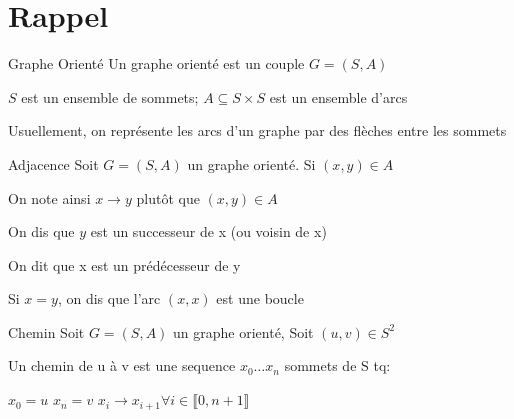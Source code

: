 \documentclass[a4paper,french,bookmarks]{article}
\begin{document}
    \renewcommand{\thesection}{\Roman{section}} 
    \renewcommand{\thesubsection}{\thesection.\Alph{subsection}}
    \renewcommand{\labelenumi}{\thesection.\arabic{enumi}.}
    \renewcommand*{\labelenumii}{\alph{enumii}.}
    \renewcommand*{\labelenumiii}{\alph{enumiii}.}
    
    \def\authorvar{DRISSI Rayan}

    \section{Rappel}


    \begin{definition}{Graphe Orienté}{}
        Un graphe orienté est un couple $G = (S, A)$
        
        \begin{enumerate}
            \itt $S$ est un ensemble de sommets;
            \itt $A \subseteq S \times S$ est un ensemble d'arcs 
        \end{enumerate}
        Usuellement, on représente les arcs d'un graphe par des flèches entre les sommets 
    \end{definition}
    
    \begin{definition}{Adjacence}{}
        Soit $G = (S, A)$ un graphe orienté. 
        Si $(x,y) \in A $
        \begin{enumerate}
            \itt On note ainsi $x \to y $ plutôt que $(x,y) \in A$
            
            \itt On dis que $y$ est un successeur de x (ou voisin de x)
            
            \itt On dit que x est un prédécesseur de y
            
            \itt Si $x=y$, on dis que l'arc $(x,x)$ est une boucle 
        

        \end{enumerate}
    
    \end{definition}
    
    \begin{definition}{Chemin}
        Soit $G = (S, A)$ un graphe orienté,
        Soit $(u,v) \in S^2$
        
        Un chemin de u à v est une sequence $x_0 \dots x_n$ sommets de S tq:
        \begin{enumerate}
            \itt $x_0 = u$
            \itt $x_n = v$
            \itt $x_i \to x_{i+1} \forall i \in \llbracket 0, n+1 \rrbracket$
        \end{enumerate}
        
    \end{definition}
    
\end{document}
